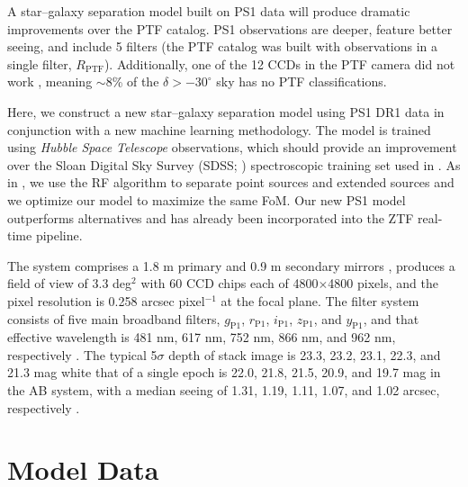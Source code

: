 \documentclass[twocolumn]{aastex62}
\begin{document}
A star--galaxy separation model built on PS1 data will produce dramatic
improvements over the PTF catalog. PS1 observations are deeper, feature
better seeing, and include 5 filters (the PTF catalog was built with
observations in a single filter, $R_\mathrm{PTF}$). Additionally, one of the
12 CCDs in the PTF camera did not work \citep{Law09}, meaning $\sim$8\% of
the $\delta > -30^\circ$ sky has no PTF classifications.

Here, we construct a new star--galaxy separation model using PS1 DR1 data in
conjunction with a new machine learning methodology. The model is trained
using \textit{Hubble Space Telescope} observations, which should provide an
improvement over the Sloan Digital Sky Survey (SDSS; \citealt{York00})
spectroscopic training set used in \citet{Miller17}. As in \citet{Miller17},
we use the RF algorithm to separate point sources and extended sources and we optimize our model to maximize the same FoM. Our
new PS1 model outperforms alternatives and has already been incorporated into
the ZTF real-time pipeline.


The system comprises a 1.8 m primary and 0.9 m secondary mirrors \citep{Hodapp04}, 
produces a field of view of 3.3 deg$^2$ with 60 CCD chips each of 4800$\times$4800 pixels, 
and the pixel resolution is 0.258 arcsec pixel$^{-1}$ at the focal plane. 
The filter system consists of five main broadband filters, 
$g_{\mathrm{P1}}$, $r_{\mathrm{P1}}$, $i_{\mathrm{P1}}$, $z_{\mathrm{P1}}$, and $y_{\mathrm{P1}}$, 
and that effective wavelength is 481 nm, 617 nm, 752 nm, 866 nm, and 962 nm, 
respectively \citep{Tonry12, Schlafly12}. 
The typical 5$\sigma$ depth of stack image is 23.3, 23.2, 23.1, 22.3, and 21.3 mag 
white that of a single epoch is 22.0, 21.8, 21.5, 20.9, and 19.7 mag in the AB system, 
with a median seeing of 1.31, 1.19, 1.11, 1.07, and 1.02 arcsec, respectively \citep{Chambers16}. 
\fi


\section{Model Data}\label{sec:model_data}
\end{document}
